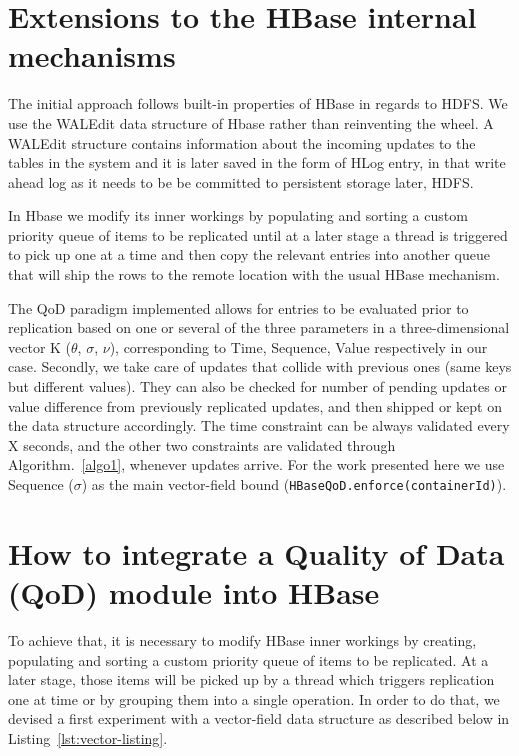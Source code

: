 \section{Extensions to the HBase internal mechanisms}\label{proposal}
The initial approach follows built-in properties of HBase in regards to HDFS. We use the WALEdit data structure of Hbase rather than reinventing the wheel. A WALEdit structure contains information about the incoming updates to the tables in the system and it is later saved in the form of HLog entry, in that write ahead log as it needs to be be committed to persistent storage later, HDFS.

In Hbase we modify its inner workings by populating and sorting a custom priority queue of items to be replicated until at a later stage a thread is triggered to pick up one at a time and then copy the relevant entries into another queue that will ship the rows to the remote location with the usual HBase mechanism.

The QoD paradigm implemented allows for entries to be evaluated prior to replication based on one or several of the three parameters in a three-dimensional vector K ($\theta$, $\sigma$, $\nu$), corresponding to Time, Sequence, Value respectively in our case. Secondly, we take care of updates that collide with previous ones (same keys but different values). They can also be checked for number of pending updates or value difference from previously replicated updates, and then shipped or kept on the data structure accordingly. The time constraint can be always validated every X seconds, and the other two constraints are validated through Algorithm.~\ref{algo1}, whenever updates arrive. For the work presented here we use Sequence ($\sigma$) as the main vector-field bound (\texttt{HBaseQoD.enforce(containerId)}).


\section{How to integrate a Quality of Data (QoD) module into HBase}\label{integration}
To achieve that, it is necessary to modify HBase inner workings by creating, populating and sorting a custom priority queue of items to be replicated. At a later stage, those items will be picked up by a thread which triggers replication one at time or by grouping them into a single operation. In order to do that, we devised a first experiment with a vector-field data structure as described below in Listing~\ref{lst:vector-listing}.


